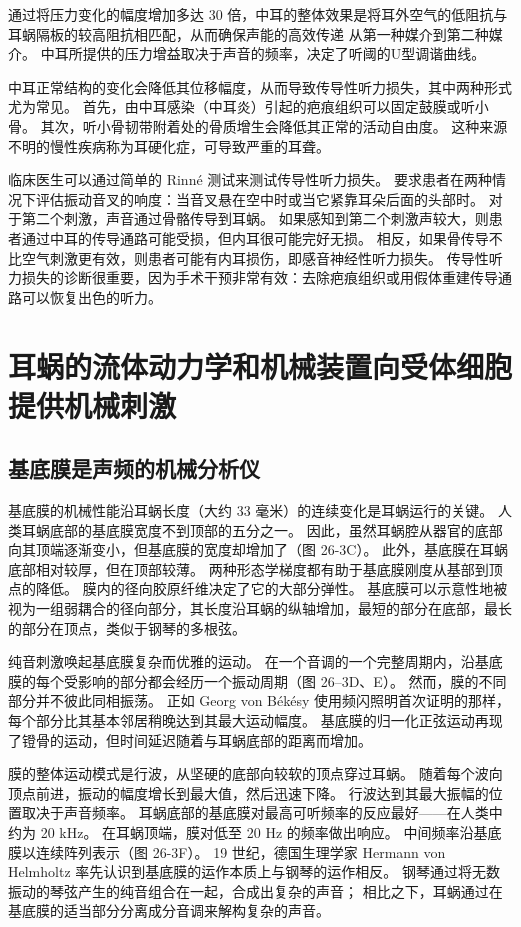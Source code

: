 通过将压力变化的幅度增加多达 30 倍，中耳的整体效果是将耳外空气的低阻抗与耳蜗隔板的较高阻抗相匹配，从而确保声能的高效传递 从第一种媒介到第二种媒介。 中耳所提供的压力增益取决于声音的频率，决定了听阈的U型调谐曲线。

中耳正常结构的变化会降低其位移幅度，从而导致传导性听力损失，其中两种形式尤为常见。 首先，由中耳感染（中耳炎）引起的疤痕组织可以固定鼓膜或听小骨。 其次，听小骨韧带附着处的骨质增生会降低其正常的活动自由度。 这种来源不明的慢性疾病称为耳硬化症，可导致严重的耳聋。

临床医生可以通过简单的 Rinné 测试来测试传导性听力损失。 要求患者在两种情况下评估振动音叉的响度：当音叉悬在空中时或当它紧靠耳朵后面的头部时。 对于第二个刺激，声音通过骨骼传导到耳蜗。 如果感知到第二个刺激声较大，则患者通过中耳的传导通路可能受损，但内耳很可能完好无损。 相反，如果骨传导不比空气刺激更有效，则患者可能有内耳损伤，即感音神经性听力损失。 传导性听力损失的诊断很重要，因为手术干预非常有效：去除疤痕组织或用假体重建传导通路可以恢复出色的听力。


\section{耳蜗的流体动力学和机械装置向受体细胞提供机械刺激}

\subsection{基底膜是声频的机械分析仪}
基底膜的机械性能沿耳蜗长度（大约 33 毫米）的连续变化是耳蜗运行的关键。 人类耳蜗底部的基底膜宽度不到顶部的五分之一。 因此，虽然耳蜗腔从器官的底部向其顶端逐渐变小，但基底膜的宽度却增加了（图 26-3C）。 此外，基底膜在耳蜗底部相对较厚，但在顶部较薄。 两种形态学梯度都有助于基底膜刚度从基部到顶点的降低。 膜内的径向胶原纤维决定了它的大部分弹性。 基底膜可以示意性地被视为一组弱耦合的径向部分，其长度沿耳蜗的纵轴增加，最短的部分在底部，最长的部分在顶点，类似于钢琴的多根弦。

纯音刺激唤起基底膜复杂而优雅的运动。 在一个音调的一个完整周期内，沿基底膜的每个受影响的部分都会经历一个振动周期（图 26–3D、E）。 然而，膜的不同部分并不彼此同相振荡。 正如 Georg von Békésy 使用频闪照明首次证明的那样，每个部分比其基本邻居稍晚达到其最大运动幅度。 基底膜的归一化正弦运动再现了镫骨的运动，但时间延迟随着与耳蜗底部的距离而增加。

膜的整体运动模式是行波，从坚硬的底部向较软的顶点穿过耳蜗。 随着每个波向顶点前进，振动的幅度增长到最大值，然后迅速下降。 行波达到其最大振幅的位置取决于声音频率。 耳蜗底部的基底膜对最高可听频率的反应最好——在人类中约为 20 kHz。 在耳蜗顶端，膜对低至 20 Hz 的频率做出响应。 中间频率沿基底膜以连续阵列表示（图 26-3F）。 19 世纪，德国生理学家 Hermann von Helmholtz 率先认识到基底膜的运作本质上与钢琴的运作相反。 钢琴通过将无数振动的琴弦产生的纯音组合在一起，合成出复杂的声音； 相比之下，耳蜗通过在基底膜的适当部分分离成分音调来解构复杂的声音。


